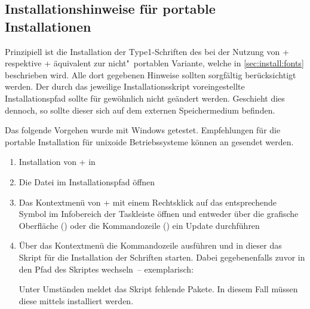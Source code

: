 \subsection{%
  Installationshinweise für portable Installationen%
  \label{sec:install:portable}%
}

Prinzipiell ist die Installation der Type1-Schriften des \CDs bei der Nutzung 
von \TeXLive+ respektive \MiKTeX+ äquivalent zur nicht"~portablen Variante, 
welche in \autoref{sec:install:fonts} beschrieben wird. Alle dort gegebenen 
Hinweise sollten sorgfältig berücksichtigt werden. Der durch das jeweilige 
Installationsskript voreingestellte Installationspfad sollte für gewöhnlich 
nicht geändert werden. Geschieht dies dennoch, so sollte dieser sich auf dem 
externen Speichermedium  befinden.


\minisec{\TeXLive+}

Das folgende Vorgehen wurde mit Windows getestet. Empfehlungen für die portable 
Installation für unixoide Betriebssysteme können an \mailto{\TUDScriptContact} 
gesendet werden.
\begin{enumerate}
\item Installation von \TeXLive+ in 
\item Die Datei  im Installationspfad öffnen
\item Das Kontextmenü von \TeXLive+ mit einem Rechtsklick auf das entsprechende 
  Symbol im Infobereich der Taskleiste öffnen und entweder über die grafische 
  Oberfläche () oder die Kommandozeile 
  () ein Update durchführen
\item Über das Kontextmenü die Kommandozeile ausführen und in dieser das Skript 
  für die Installation der Schriften  starten. 
  Dabei gegebenenfalls zuvor in den Pfad des Skriptes wechseln~-- exemplarisch:
  \begin{quoting}
  \RET*%
  \RET%
  \end{quoting}
  Unter Umständen meldet das Skript fehlende Pakete. In diesem Fall müssen 
  diese mittels  installiert werden.
\end{enumerate}


